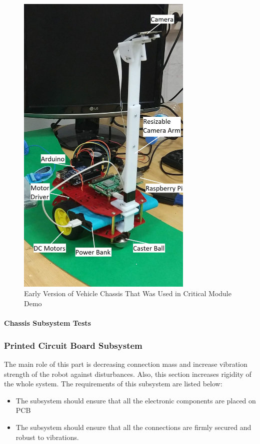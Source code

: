 \documentclass[a4paper,12pt]{article}
\begin{document}
		\begin{figure}[H]
			\center
			\setlength{\unitlength}{\textwidth} 								 
			\includegraphics[width=0.75\textwidth]{images/chassis3}
			\caption{\label{fig:chassis}Early Version of Vehicle Chassis That Was Used in Critical Module Demo}
		\end{figure}
	
	\paragraph{Chassis Subsystem Tests}
	
	
	
	\subsubsection{Printed Circuit Board Subsystem}
	The main role of this part is decreasing connection mass and increase vibration strength of the robot against disturbances. Also, this section increases rigidity of the whole system. The requirements of this subsystem are listed below:
	\begin{itemize}
		\item The subsystem should ensure that all the electronic components are placed on PCB
		\item The subsystem should ensure that all the connections are firmly secured and robust to vibrations.
	\end{itemize}
	
\end{document}
